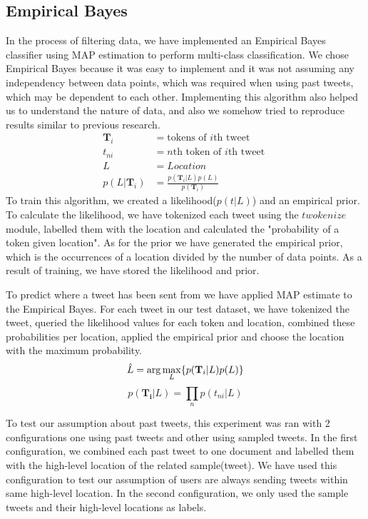 \documentclass[twoside,11pt]{article}
\begin{document}
\subsection{Empirical Bayes}

In the process of filtering data, we have implemented an Empirical Bayes\cite{carlin1997bayes} classifier using MAP estimation\cite{degrooth} to perform multi-class classification. We chose Empirical Bayes because it was easy to implement and it was not assuming any independency between data points, which was required when using past tweets, which may be dependent to each other. Implementing this algorithm also helped us to understand the nature of data, and also we somehow tried to reproduce results similar to previous research.
\begin{equation*}
\begin{split}
\mathbf{T}_i & = \text{tokens of $i$th tweet }\\
t_{ni} & = \text{$n$th token of $i$th tweet }\\
L &= Location \\
p(L|\mathbf{T}_i) &= \frac{p(\mathbf{T}_i | L)p(L)}{p(\mathbf{T}_{i})} 
\end{split}
\end{equation*}
To train this algorithm, we created a likelihood($p(t | L)$) and an empirical prior. To calculate the likelihood, we have tokenized each tweet using the $twokenize$ module\cite{gimpel2011part}, labelled them with the location and calculated the "probability of a token given location". As for the prior we have generated the empirical prior, which is the occurrences of a location divided by the number of data points. As a result of training, we have stored the likelihood and prior.

To predict where a tweet has been sent from we have applied MAP estimate to the Empirical Bayes. For each tweet in our test dataset, we have tokenized the tweet, queried the likelihood values for each token and location, combined these probabilities per location, applied the empirical prior and choose the location with the maximum probability.
\begin{equation*}
\hat{L} = \arg\max_L\{p(\mathbf{T}_i | L) p(L)\}\\
\end{equation*}
\begin{equation*}
p(\mathbf{T_i} | L) = \prod_n{p(t_{ni}|L)}
\end{equation*}

To test our assumption about past tweets, this experiment was ran with 2 configurations one using past tweets and other using sampled tweets. In the first configuration, we combined each past tweet to one document and labelled them with the high-level location of the related sample(tweet). We have used this configuration to test our assumption of users are always sending tweets within same high-level location. In the second configuration, we only used the sample tweets and their high-level locations as labels.
\end{document}
